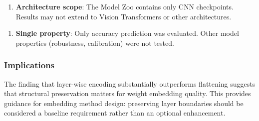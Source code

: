 \begin{enumerate}
\item \textbf{Architecture scope}: The Model Zoo contains only CNN checkpoints. Results may not extend to Vision Transformers or other architectures.
\end{enumerate}

\begin{enumerate}
\item \textbf{Single property}: Only accuracy prediction was evaluated. Other model properties (robustness, calibration) were not tested.
\end{enumerate}

\subsubsection{Implications}

The finding that layer-wise encoding substantially outperforms flattening suggests that structural preservation matters for weight embedding quality. This provides guidance for embedding method design: preserving layer boundaries should be considered a baseline requirement rather than an optional enhancement.
